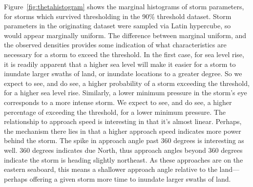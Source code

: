 Figure~\ref{fig:thetahistogram} shows the marginal histograms of storm parameters, for 
    storms which survived thresholding in the 90\% threshold dataset.  Storm parameters in 
    the originating dataset were sampled via Latin hypercube, so would appear marginally
    uniform.  The difference between marginal uniform, and the observed densities provides
    some indication of what characteristics are necessary for a storm to exceed the threshold.
    In the first case, for sea level rise, it is readily apparent that a higher sea level will
    make it easier for a storm to inundate larger swaths of land, or inundate locations to a
    greater degree.  So we expect to see, and do see, a higher probability of a storm exceeding
    the threshold, for a higher sea level rise.  Similarly, a lower minimum pressure in the storm's
    eye corresponds to a more intense storm.  We expect to see, and do see, a higher percentage of
    exceeding the threshold, for a lower minimum pressure.  The relationship to approach speed is 
    interesting in that it's almost linear.  Perhaps, the mechanism there lies in that a higher
    approach speed indicates more power behind the storm.  The spike in approach angle past 360
    degrees is interesting as well. 360 degrees indicates due North, thus approach angles 
    beyond 360 degrees indicate the storm is heading slightly northeast. As these approaches are
    on the eastern seaboard, this means a shallower approach angle relative to the
    land---perhaps offering a given storm more time to inundate larger swaths of land.

